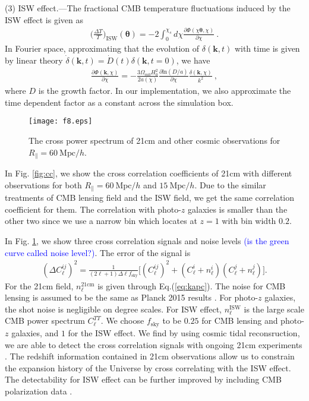 \documentclass[aps,prl,twocolumn,showpacs,superscriptaddress,groupedaddress,nofootinbib]{revtex4}  %
\newcommand{\mr}{\mathrm}
\newcommand{\tcb}{\textcolor{blue}}
\begin{document}
(3) ISW effect.---The fractional CMB temperature fluctuations induced by the 
ISW effect is given as 
\begin{eqnarray}
\bigg(\frac{\Delta T}{T}\bigg)_\mr{ISW}(\bm\theta)=-2\int_0^{\chi_s}d\chi
\frac{\partial\Phi(\chi\bm{\theta},\chi)}{\partial\chi}\ .
\end{eqnarray}
In Fourier space, approximating that the evolution of $\delta(\bm{k},t)$ with 
time is given by linear theory
$\dot\delta(\bm{k},t)=\dot D(t)\delta(\bm{k},t=0)$, we have
\begin{eqnarray}
\frac{\partial\Phi(\bm{k},\chi)}{\partial\chi}=-\frac{3\Omega_{m0}H_0^2}
{2a(\chi)}\frac{\partial\mr{ln}(D/a)}{\partial\chi}
\frac{\delta(\bm{k},\chi)}{k^2}\ ,
\end{eqnarray}
where $D$ is the growth factor.
In our implementation, we also approximate the time dependent factor as a 
constant across the simulation box.

\begin{figure}[tbp]
\begin{center}
\texttt{[image: f8.eps]}
\end{center}
\vspace{-1.9cm}
\caption{The cross power spectrum of 21cm and other cosmic observations  
for $R_\parallel=60\ \mr{Mpc}/h$.}
\label{fig:cs}
\end{figure}

In Fig. \ref{fig:cc}, we show the cross correlation coefficients of 21cm with 
different observations for both $R_\parallel=60\ \mr{Mpc}/h$ and 
$15\ \mr{Mpc}/h$. Due to the similar treatments of CMB lensing field
and the ISW field, we get the same correlation coefficient for them. 
The correlation with photo-$z$ galaxies is smaller than the other
two since we use a narrow bin which locates at $z=1$ with bin width $0.2$.

In Fig. \ref{fig:cs}, we show three cross correlation signals and noise
levels \tcb{(is the green curve called noise level?)}. The error of  
the signal is 
\begin{eqnarray}
(\Delta C_\ell^{ij})^2=\frac{1}{(2\ell+1)\Delta\ell f_\mr{sky}}
\bigg[{(C_\ell^{ij})^2+(C_\ell^{i}+n_\ell^{i})
(C_\ell^{j}+n_\ell^{j})}\bigg].
\end{eqnarray}
For the 21cm field, $n_\ell^\mr{21cm}$ is given through Eq.(\ref{eq:kapc}). 
The noise for CMB lensing is assumed to be the same as Planck 2015 results 
\cite{2015:plancklensing}. For photo-$z$ galaxies, the shot noise is negligible
on degree scales. For ISW effect, $n_\ell^\mr{ISW}$ is the large scale
CMB power spectrum $C_\ell^{TT}$. We choose $f_\mr{sky}$ to be $0.25$ for 
CMB lensing and photo-$z$ galaxies, and $1$ for the ISW effect. We find by
using cosmic tidal reconsruction, we are able to detect the cross correlation
signals with ongoing 21cm experiments \cite{2014SPIE.9145E..22B,2014SPIE.9145E..4VN,2012IJMPS..12..256C,2015ApJ...798...40X}. 
The redshift information contained in 21cm observations allow us to constrain
the expansion history of the Universe by cross correlating with the ISW effect.
The detectability for ISW effect can be further improved by including CMB 
polarization data \cite{2011PhRvD..83f3001L}.
\end{document}
